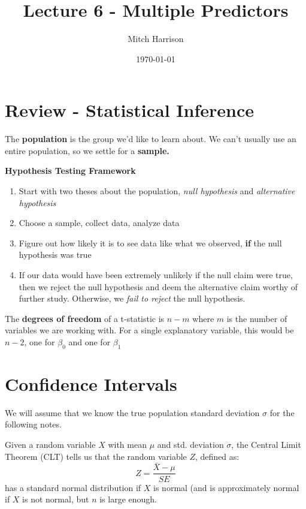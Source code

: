 \documentclass[titlepage, 12pt, leqno]{article}
\title{\Huge{Lecture 6 - Multiple Predictors}}
\author{\large{Mitch Harrison}}
\date{\today}
\begin{document}
\setlength{\parskip}{1\baselineskip}
\setlength{\parindent}{15pt}
\maketitle
\tableofcontents
\newpage


\section{Review - Statistical Inference}

The \textbf{population} is the group we'd like to learn about. We can't usually use an entire population, so we settle for a \textbf{sample.} 

\textbf{Hypothesis Testing Framework} 
\begin{enumerate}
    \item Start with two theses about the population, \textit{null hypothesis} and \textit{alternative hypothesis} 
    \item Choose a sample, collect data, analyze data
    \item Figure out how likely it is to see data like what we observed, \textbf{if} the null hypothesis was true
    \item If our data would have been extremely unlikely if the null claim were true, then we reject the null hypothesis and deem the alternative claim worthy of further study. Otherwise, we \textit{fail to reject} the null hypothesis.
\end{enumerate}

\begin{definition}
    The \textbf{degrees of freedom} of a t-statistic is $n-m$ where $m$ is the number of variables we are working with. For a single explanatory variable, this would be $n-2$, one for $\beta_0$ and one for $\beta_1$
\end{definition}

\pagebreak
\section{Confidence Intervals}
\begin{note}
    We will assume that we know the true population standard deviation $\sigma$ for the following notes.
\end{note}

Given a random variable $X$ with mean $\mu$ and std. deviation $\sigma$, the Central Limit Theorem (CLT) tells us that the random variable $Z$, defined as:
\[
Z = \frac{\bar X - \mu}{SE} 
\]
has a standard normal distribution if $X$ is normal (and is approximately normal if $X$ is not normal, but $n$ is large enough.
\end{document}
